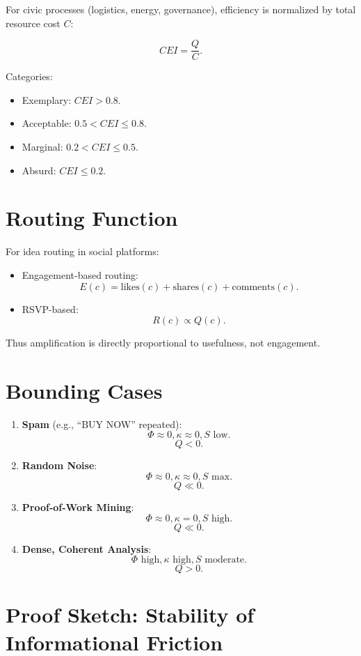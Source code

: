 \documentclass[openany]{book}
\begin{document}
For civic processes (logistics, energy, governance), efficiency is normalized by total resource cost $C$:

\[ CEI = \frac{Q}{C}. \]

Categories:

\begin{itemize}
    \item Exemplary: $CEI > 0.8$.
    \item Acceptable: $0.5 < CEI \leq 0.8$.
    \item Marginal: $0.2 < CEI \leq 0.5$.
    \item Absurd: $CEI \leq 0.2$.
\end{itemize}

\section{Routing Function}

For idea routing in social platforms:

\begin{itemize}
    \item Engagement-based routing:
    \[ E(c) = \text{likes}(c) + \text{shares}(c) + \text{comments}(c). \]
    \item RSVP-based:
    \[ R(c) \propto Q(c). \]
\end{itemize}

Thus amplification is directly proportional to usefulness, not engagement.

\section{Bounding Cases}

\begin{enumerate}
    \item \textbf{Spam} (e.g., ``BUY NOW'' repeated):
    \[ \Phi \approx 0, \kappa \approx 0, S \text{ low}. \]
    \[ Q < 0. \]
    \item \textbf{Random Noise}:
    \[ \Phi \approx 0, \kappa \approx 0, S \text{ max}. \]
    \[ Q \ll 0. \]
    \item \textbf{Proof-of-Work Mining}:
    \[ \Phi \approx 0, \kappa = 0, S \text{ high}. \]
    \[ Q \ll 0. \]
    \item \textbf{Dense, Coherent Analysis}:
    \[ \Phi \text{ high}, \kappa \text{ high}, S \text{ moderate}. \]
    \[ Q > 0. \]
\end{enumerate}

\section{Proof Sketch: Stability of Informational Friction}
\end{document}
